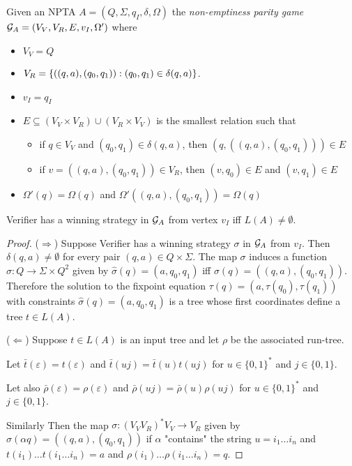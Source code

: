 \documentclass[runningheads,a4paper]{llncs}
\begin{document}
\begin{definition}\label{def:non-emptiness-parity-game}
Given an NPTA $A = (Q, \Sigma, q_I, \delta, \Omega)$ the \emph{non-emptiness parity game} 
 $\mathcal{G}_{A} = (V_V, V_R, E, v_I, \Omega')$ where 
\begin{itemize}
\item $V_V = Q$
\item $V_R = \{((q,a), (q_0,q_1)) : (q_0,q_1) \in \delta(q,a)\}$.
\item $v_I = q_I$
\item $E \subseteq (V_V \times V_R) \cup (V_R \times V_V)$ is the smallest relation such that
\begin{itemize}
\item if $q \in V_V$ and $(q_0, q_1) \in \delta(q, a)$, then $(q, ((q,a),(q_0, q_1))) \in E$
\item if $v = ((q,a),(q_0,q_1)) \in V_R$, then $(v, q_0)\in E$ and $(v,q_1) \in E$
\end{itemize}
\item $\Omega'(q) = \Omega(q)$ and $\Omega'((q,a),(q_0,q_1)) = \Omega(q)$
\end{itemize}
\end{definition}

\begin{lemma}\label{lem:non-emptiness-game}
Verifier has a winning strategy in $\mathcal{G}_{A}$ from vertex $v_I$ iff $L(A) \neq \emptyset$.
\end{lemma}

\begin{proof}
\noindent ($\Rightarrow$) Suppose Verifier has a winning strategy $\sigma$ in $\mathcal{G}_{A}$ from $v_I$. Then $\delta(q,a) \neq \emptyset$ for every pair $(q,a) \in Q \times \Sigma$. The map $\sigma$ induces a function 
 $\hat{\sigma}: Q \to \Sigma \times Q^2$ given by $\hat{\sigma}(q) = (a,q_0,q_1)$ iff 
 $\sigma(q) = ((q,a),(q_0, q_1))$. Therefore the solution to the fixpoint equation  
 $\tau(q) = (a,\tau(q_0),\tau(q_1))$ with constraints $\hat{\sigma}(q) = (a,q_0,q_1)$ is a tree whose first coordinates
  define a tree $t \in L(A)$.

\noindent ($\Leftarrow$) Suppose $t \in L(A)$ is an input tree and let $\rho$ be the associated run-tree. 

Let $\bar{t}(\varepsilon) = t(\varepsilon)$ and $\bar{t}(uj) = \bar{t}(u)t(uj)$ for $u \in \{0,1\}^*$ and $j \in \{0,1\}$. 

Let also $\bar{\rho}(\varepsilon) = \rho(\varepsilon)$ and $\bar{\rho}(uj) = \bar{\rho}(u)\rho(uj)$ for $u \in \{0,1\}^*$ and $j \in \{0,1\}$.

Similarly Then the map $\sigma: (V_VV_R)^*V_V \to V_R$ given by $\sigma(\alpha q) = ((q,a), (q_0,q_1))$ if $\alpha$ "contains" the string $u = i_1\ldots i_n$ and $t(i_1)\ldots t(i_1\ldots i_n) = a$ and $\rho(i_1)\ldots \rho(i_1\ldots i_n) = q$. 

\end{proof}

%
\end{document}
